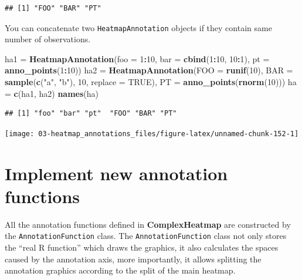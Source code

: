 \documentclass[]{book}
\newenvironment{Shaded}{\begin{snugshade}}{\end{snugshade}}
\newcommand{\KeywordTok}[1]{\textcolor[rgb]{0.13,0.29,0.53}{\textbf{#1}}}
\newcommand{\DataTypeTok}[1]{\textcolor[rgb]{0.13,0.29,0.53}{#1}}
\newcommand{\DecValTok}[1]{\textcolor[rgb]{0.00,0.00,0.81}{#1}}
\newcommand{\StringTok}[1]{\textcolor[rgb]{0.31,0.60,0.02}{#1}}
\newcommand{\OtherTok}[1]{\textcolor[rgb]{0.56,0.35,0.01}{#1}}
\newcommand{\OperatorTok}[1]{\textcolor[rgb]{0.81,0.36,0.00}{\textbf{#1}}}
\newcommand{\NormalTok}[1]{#1}
\theoremstyle{definition}
\theoremstyle{definition}
\theoremstyle{definition}
\theoremstyle{remark}
\begin{document}
\begin{verbatim}
## [1] "FOO" "BAR" "PT"
\end{verbatim}

You can concatenate two \texttt{HeatmapAnnotation} objects if they
contain same number of observations.

\begin{Shaded}
\begin{Highlighting}[]
\NormalTok{ha1 =}\StringTok{ }\KeywordTok{HeatmapAnnotation}\NormalTok{(}\DataTypeTok{foo =} \DecValTok{1}\OperatorTok{:}\DecValTok{10}\NormalTok{, }
    \DataTypeTok{bar =} \KeywordTok{cbind}\NormalTok{(}\DecValTok{1}\OperatorTok{:}\DecValTok{10}\NormalTok{, }\DecValTok{10}\OperatorTok{:}\DecValTok{1}\NormalTok{),}
    \DataTypeTok{pt =} \KeywordTok{anno_points}\NormalTok{(}\DecValTok{1}\OperatorTok{:}\DecValTok{10}\NormalTok{))}
\NormalTok{ha2 =}\StringTok{ }\KeywordTok{HeatmapAnnotation}\NormalTok{(}\DataTypeTok{FOO =} \KeywordTok{runif}\NormalTok{(}\DecValTok{10}\NormalTok{), }
    \DataTypeTok{BAR =} \KeywordTok{sample}\NormalTok{(}\KeywordTok{c}\NormalTok{(}\StringTok{"a"}\NormalTok{, }\StringTok{"b"}\NormalTok{), }\DecValTok{10}\NormalTok{, }\DataTypeTok{replace =} \OtherTok{TRUE}\NormalTok{),}
    \DataTypeTok{PT =} \KeywordTok{anno_points}\NormalTok{(}\KeywordTok{rnorm}\NormalTok{(}\DecValTok{10}\NormalTok{)))}
\NormalTok{ha =}\StringTok{ }\KeywordTok{c}\NormalTok{(ha1, ha2)}
\KeywordTok{names}\NormalTok{(ha)}
\end{Highlighting}
\end{Shaded}

\begin{verbatim}
## [1] "foo" "bar" "pt"  "FOO" "BAR" "PT"
\end{verbatim}

\begin{center}\texttt{[image: 03-heatmap\_annotations\_files/figure-latex/unnamed-chunk-152-1]} \end{center}

\section{Implement new annotation
functions}\label{implement-new-annotation-functions}

All the annotation functions defined in \textbf{ComplexHeatmap} are
constructed by the \texttt{AnnotationFunction} class. The
\texttt{AnnotationFunction} class not only stores the ``real R
function'' which draws the graphics, it also calculates the spaces
caused by the annotation axis, more importantly, it allows splitting the
annotation graphics according to the split of the main heatmap.
\end{document}
